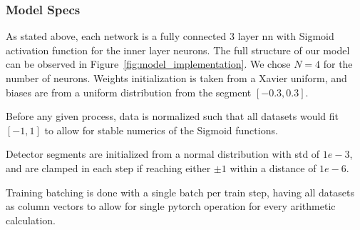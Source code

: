 \documentclass[paper/ddppaper2.tex]{subfiles}
\begin{document}
\subsubsection{Model Specs}

As stated above, each network is a fully connected 3 layer \gls{nn} with Sigmoid activation function for the inner layer neurons. The full structure of our model can be observed in Figure~\ref{fig:model_implementation}. We chose $N=4$ for the number of neurons. Weights initialization is taken from a Xavier uniform, and biases are from a uniform distribution from the segment $[-0.3, 0.3]$.

Before any given process, data is normalized such that all datasets would fit $[-1, 1]$ to allow for stable numerics of the Sigmoid functions.

Detector segments are initialized from a normal distribution with std of $1e-3$, and are clamped in each step if reaching either $\pm 1$ within a distance of $1e-6$.

Training batching is done with a single batch per train step, having all datasets as column vectors to allow for single pytorch operation for every arithmetic calculation.


\iftrue %
\par\medskip{}\medskip
\fi %
 
\end{document}

